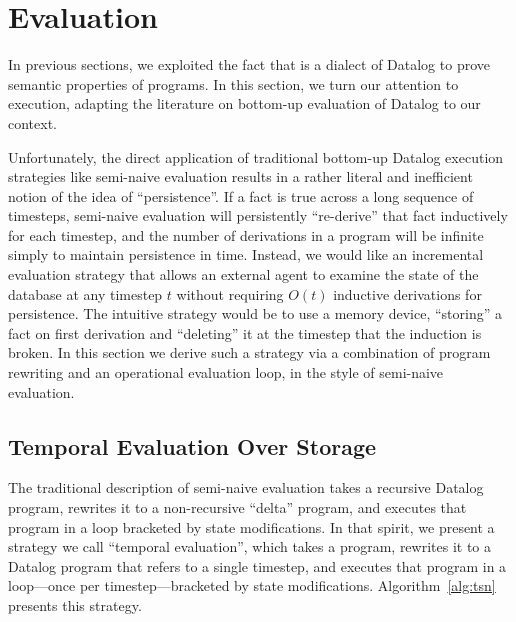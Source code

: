 \section{Evaluation}
In previous sections, we exploited the fact that \slang is a dialect of Datalog to prove semantic properties of \slang programs.  In this section, we turn our attention to execution, adapting the literature on bottom-up evaluation of Datalog to our context.

Unfortunately, the direct application of traditional bottom-up Datalog execution strategies like semi-naive evaluation results in a rather literal and inefficient notion of the idea of ``persistence''.  If a fact is true across a long sequence of timesteps, semi-naive evaluation will persistently ``re-derive'' that fact inductively for each timestep, and the number of derivations in a program will be infinite simply to maintain persistence in time.  Instead, we would like an incremental evaluation strategy that allows an external agent to examine the state of the database at any timestep $t$ without requiring $O(t)$ inductive derivations for persistence.  The intuitive strategy would be to use a memory device, ``storing'' a fact on first derivation and ``deleting'' it at the timestep that the induction is broken.  In this section we derive such a strategy via a combination of program rewriting and an operational evaluation loop, in the style of semi-naive evaluation.

\subsection{Temporal Evaluation Over Storage}
The traditional description of semi-naive evaluation takes a recursive Datalog program, rewrites it to a non-recursive ``delta'' program, and executes that program in a loop bracketed by state modifications.  In that spirit, we present a strategy we call ``temporal evaluation'', which takes a \slang program, rewrites it to a Datalog program that refers to a single timestep, and executes that program in a loop---once per timestep---bracketed by state modifications.  Algorithm~\ref{alg:tsn} presents this strategy.

